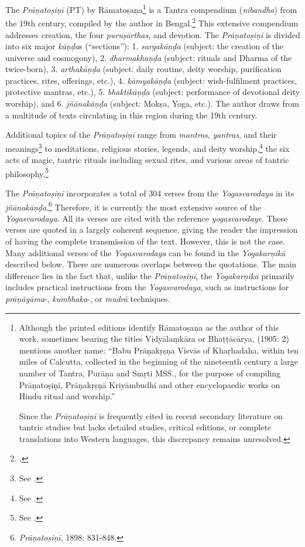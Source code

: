 The \textit{Prāṇatoṣiṇī} (PT) by Rāmatoṣaṇa\footnote{Although the printed editions identify Rāmatoṣaṇa as the author of this work, sometimes bearing the titles Vidyālaṃkāra or Bhaṭṭācārya, \citeauthor{shastri1905} (1905: 2) mentions another name: ``Babu Prāṇakṛṣṇa Visvās of Khaṛhadaha, within ten miles of Calcutta, collected in the beginning of the nineteenth century a large number of Tantra, Purāṇa and Smṛti MSS., for the purpose of compiling Prāṇatoṣiṇī, Prāṇakṛṣṇā Kriyāmbudhi and other encyclopaedic works on Hindu ritual and worship.''

Since the \textit{Prāṇatoṣiṇī} is frequently cited in recent secondary literature on tantric studies but lacks detailed studies, critical editions, or complete translations into Western languages, this discrepancy remains unresolved.} is a Tantra compendium (\textit{nibandha}) from the 19th century, compiled by the author in Bengal.\footnote{\cite{amatosana}.} This extensive compendium addresses creation, the four \textit{puruṣārthas}, and devotion. The \textit{Prāṇatoṣiṇī} is divided into six major \textit{kāṇḍa}s (``sections''): 1. \textit{sargakāṇḍa} (subject: the creation of the universe and cosmogony), 2. \textit{dharmakhaṇḍa} (subject: rituals and Dharma of the twice-born), 3. \textit{arthakāṇḍa} (subject: daily routine, deity worship, purification practices, rites, offerings, etc.), 4. \textit{kāmyakāṇḍa} (subject: wish-fulfilment practices, protective mantras, etc.), 5. \textit{bhaktikāṇḍa} (subject: performance of devotional deity worship), and 6. \textit{jñānakāṇḍa} (subject: Mokṣa, Yoga, etc.). The author draws from a multitude of texts circulating in this region during the 19th century.

Additional topics of the \textit{Prāṇatoṣiṇī} range from \textit{mantras}, \textit{yantras}, and their meanings\footnote{See \citeauthor[2010: 69-70]{slouber2010}.} to meditations, religious stories, legends, and deity worship,\footnote{See \citeauthor[1997: 149-150]{kinsley1997}.} the six acts of magic, tantric rituals including sexual rites, and various areas of tantric philosophy.\footnote{See \citeauthor[2010: 100]{urban2010}.}

The \textit{Prāṇatoṣiṇī} incorporates a total of 304 verses from the \textit{Yogasvarodaya} in its \textit{jñānakāṇḍa}.\footnote{\emph{Prāṇatoṣiṇī}, 1898: 831-848.} Therefore, it is currently the most extensive source of the \emph{Yogasvarodaya}. All its verses are cited with the reference \textit{yogasvarodaye}. These verses are quoted in a largely coherent sequence, giving the reader the impression of having the complete transmission of the text. However, this is not the case. Many additional verses of the \emph{Yogasvarodaya} can be found in the \emph{Yogakarṇikā} described below. There are numerous overlaps between the quotations. The main difference lies in the fact that, unlike the \textit{Prāṇatoṣiṇī}, the \emph{Yogakarṇikā} primarily includes practical instructions from the \textit{Yogasvarodaya}, such as instructions for \textit{prāṇāyāma}-, \textit{kumbhaka}-, or \textit{mudrā} techniques.

